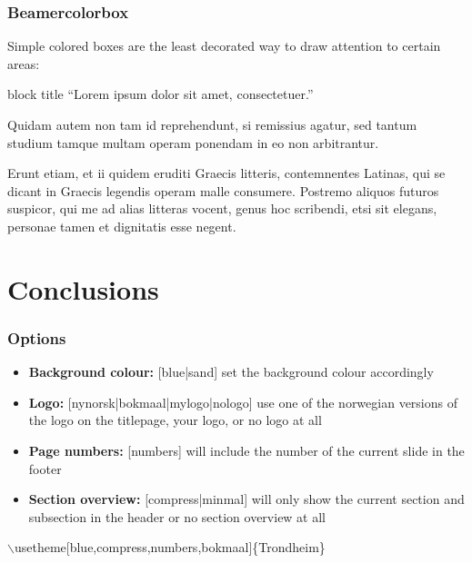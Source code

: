 \documentclass{beamer}
\begin{document}
\begin{frame}
  \frametitle{Beamercolorbox}

  Simple colored boxes are the least decorated way to draw attention to certain areas:\newline

  \begin{beamercolorbox}[sep=0.5em]{block title}
    ``Lorem ipsum dolor sit amet, consectetuer.''
  \end{beamercolorbox}

  \vspace*{.5cm}

  Quidam autem non tam id reprehendunt, si remissius agatur, sed tantum studium tamque multam operam ponendam in eo non arbitrantur.

  Erunt etiam, et ii quidem eruditi Graecis litteris, contemnentes Latinas, qui se dicant in Graecis legendis operam malle consumere. Postremo aliquos futuros suspicor, qui me ad alias litteras vocent, genus hoc scribendi, etsi sit elegans, personae tamen et dignitatis esse negent.

\end{frame}

\section{Conclusions}

\begin{frame}
  \frametitle{Options}

  \begin{itemize}
    \item{\textbf{Background colour:} [blue|sand] set the background colour accordingly}
    \item{\textbf{Logo:} [nynorsk|bokmaal|mylogo|nologo] use one of the norwegian versions of the logo on the titlepage, your logo, or no logo at all}
    \item{\textbf{Page numbers:} [numbers] will include the number of the current slide in the footer}
    \item{\textbf{Section overview:} [compress|minmal] will only show the current section and subsection in the header or no section overview at all}
  \end{itemize}

  \begin{example}
   $\backslash$usetheme[blue,compress,numbers,bokmaal]\{Trondheim\}
  \end{example}
\end{frame}
\end{document}
